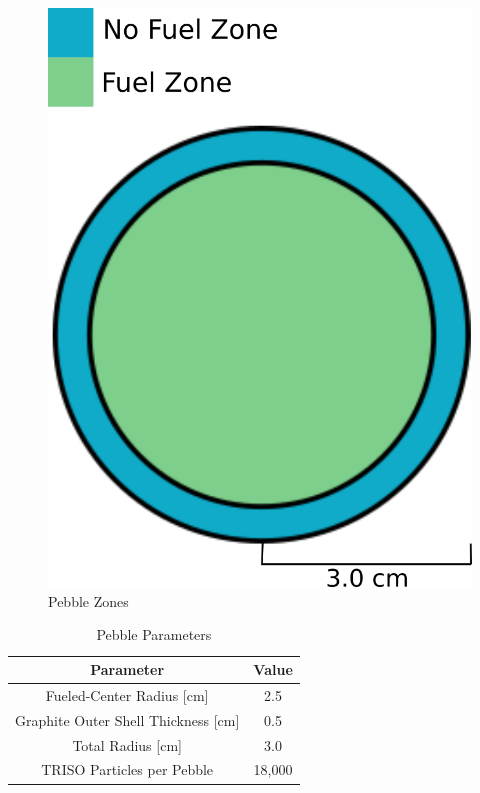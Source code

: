 \begin{figure}[H]
\centering

\includegraphics[width=0.5\linewidth]{figures/pebble-zones.png}
\caption{Pebble Zones}
\label{fig:pebb-zone1}
\end{figure}


\begin{table}[h!]
\centering

\caption{Pebble Parameters}
\begin{tabular}{ c  c }
\hline
Parameter & Value \\
\hline
Fueled-Center Radius [cm] & 2.5 \\
Graphite Outer Shell Thickness [cm] & 0.5 \\
Total Radius [cm] & 3.0 \\
TRISO Particles per Pebble & 18,000 \\
\hline
\end{tabular}
\label{table:peb-params}
\end{table}
